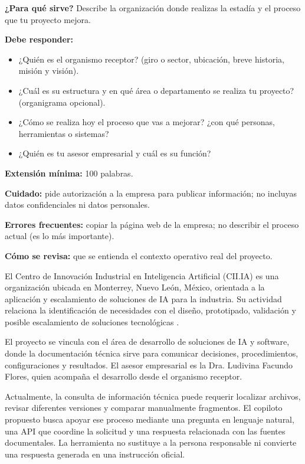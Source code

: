 \begin{guia}
\textbf{¿Para qué sirve?} Describe la organización donde realizas la estadía y el proceso que tu proyecto mejora.

\textbf{Debe responder:}
\begin{itemize}[nosep,leftmargin=*]
  \item ¿Quién es el organismo receptor? (giro o sector, ubicación, breve historia, misión y visión).
  \item ¿Cuál es su estructura y en qué área o departamento se realiza tu proyecto? (organigrama opcional).
  \item ¿Cómo se realiza hoy el proceso que vas a mejorar? ¿con qué personas, herramientas o sistemas?
  \item ¿Quién es tu asesor empresarial y cuál es su función?
\end{itemize}

\textbf{Extensión mínima:} 100 palabras.

\textbf{Cuidado:} pide autorización a la empresa para publicar información; no incluyas datos confidenciales ni
datos personales.

\textbf{Errores frecuentes:} copiar la página web de la empresa; no describir el proceso actual (es lo más importante).

\textbf{Cómo se revisa:} que se entienda el contexto operativo real del proyecto.
\end{guia}

El Centro de Innovación Industrial en Inteligencia Artificial (CII.IA) es una organización ubicada en Monterrey, Nuevo León, México, orientada a la aplicación y escalamiento de soluciones de IA para la industria. Su actividad relaciona la identificación de necesidades con el diseño, prototipado, validación y posible escalamiento de soluciones tecnológicas \cite{ciiia2026,ciiia2026b}.

El proyecto se vincula con el área de desarrollo de soluciones de IA y software, donde la documentación técnica sirve para comunicar decisiones, procedimientos, configuraciones y resultados. El asesor empresarial es la Dra. Ludivina Facundo Flores, quien acompaña el desarrollo desde el organismo receptor.

Actualmente, la consulta de información técnica puede requerir localizar archivos, revisar diferentes versiones y comparar manualmente fragmentos. El copiloto propuesto busca apoyar ese proceso mediante una pregunta en lenguaje natural, una API que coordine la solicitud y una respuesta relacionada con las fuentes documentales. La herramienta no sustituye a la persona responsable ni convierte una respuesta generada en una instrucción oficial.

